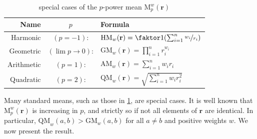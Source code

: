 \begin{subappendices}
\begin{table}
\centering
\renewcommand{\arraystretch}{1.5} %
\begin{tabular}{rcl}
	\textbf{Name} & $p$ & \textbf{Formula}\\\hline
	Harmonic&$(p=-1)$:& $\mathrm{HM}_w(\mathbf r) = \faktor1{\left(\sum_{i=1}^n \nicefrac{w_i}{r_i}\right)}$ \\
	Geometric&$(\lim {p\to 0})$:& $\mathrm{GM}_w(\mathbf r) = \prod_{i=1}^n r_i^{w_i}$ \\
	Arithmetic&$(p=1)$:& $\mathrm{AM}_w(\mathbf r) = \sum_{i=1}^n w_i r_i$ \\
	Quadratic&$(p=2)$:& $\mathrm{QM}_w(\mathbf r) = \sqrt{\textstyle\sum_{i=1}^n w_i r_i^2}$\\\hline
	\end{tabular}
	\caption{special cases of the $p$-power mean $\mathrm M_p^w(\mathbf r)$}
	\label{tab:power-means}
\end{table}

Many standard means, such as those in \cref{tab:power-means}, are special cases.
It is well known that $\mathrm M_p^w(\mathbf r)$ is increasing in $p$, and strictly so if not all elements of $\mathbf r$ are identical. In particular, $\mathrm{QM}_w(a,b) > \mathrm{GM}_w(a,b)$ for all $a \ne b$ and positive weights $w$. We now present the result.


\end{subappendices}
